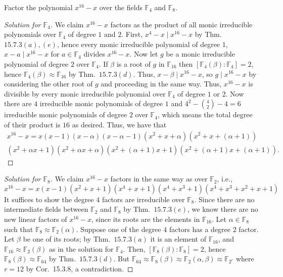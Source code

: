 \documentclass[12pt]{article}
\theoremstyle{remark}
\begin{document}
\setcounter{subsubsection}{5}
\begin{problem}
  Factor the polynomial $x^{16} - x$ over the fields $\mathbb{F}_4$ and $\mathbb{F}_8$.
\end{problem}
\begin{proof}[Solution for $\mathbb{F}_4$]
  We claim $x^{16}- x$ factors as the product of all monic irreducible polynomials over $\mathbb{F}_4$ of degree $1$ and $2$. First, $x^4-x \mid x^{16}-x$ by Thm.~$15.7.3(a),(e)$, hence every monic irreducible polynomial of degree $1$, $x-a \mid x^{16} - x$ for $a \in \mathbb{F}_4$ divides $x^{16} - x$. Now let $g$ be a monic irreducible polynomial of degree $2$ over $\mathbb{F}_4$. If $\beta$ is a root of $g$ in $\mathbb{F}_{16}$ then $[\mathbb{F}_4(\beta) : \mathbb{F}_4] = 2$, hence $\mathbb{F}_4(\beta) \approx \mathbb{F}_{16}$ by Thm.~$15.7.3(d)$. Thus, $x-\beta \mid x^{16} - x$, so $g \mid x^{16} - x$ by considering the other root of $g$ and proceeding in the same way. Thus, $x^{16} - x$ is divisible by every monic irreducible polynomial over $\mathbb{F}_4$ of degree $1$ or $2$. Now there are $4$ irreducible monic polynomials of degree $1$ and $4^2 - \binom{4}{2} - 4 = 6$ irreducible monic polynomials of degree $2$ over $\mathbb{F}_4$, which means the total degree of their product is $16$ as desired. Thus, we have that
  \begin{multline*}
    x^{16}-x = x(x-1)(x-\alpha)(x-\alpha-1)(x^2+x+\alpha)(x^2+x+(\alpha+1))\\
    (x^2 + \alpha x + 1)(x^2 + \alpha x + \alpha)(x^2 + (\alpha+1)x + 1)(x^2 + (\alpha+1)x + (\alpha+1)).\tag*{\qed}
  \end{multline*}
  \renewcommand{\qedsymbol}{}
\end{proof}
\vspace{-2\baselineskip}
\begin{proof}[Solution for $\mathbb{F}_8$]
  We claim $x^{16} - x$ factors in the same way as over $\mathbb{F}_2$, i.e.,
  \begin{equation*}
    x^{16}-x = x(x-1)(x^2 + x + 1)(x^4 + x + 1)(x^4 + x^3 + 1)(x^4 + x^3 + x^2 + x + 1)
  \end{equation*}
  It suffices to show the degree $4$ factors are irreducible over $\mathbb{F}_8$. Since there are no intermediate fields between $\mathbb{F}_2$ and $\mathbb{F}_8$ by Thm.~$15.7.3(e)$, we know there are no new linear factors of $x^{16}-x$, since its roots are the elements in $\mathbb{F}_{16}$. Let $\alpha \in \mathbb{F}_8$ such that $\mathbb{F}_8 \approx \mathbb{F}_2(\alpha)$. Suppose one of the degree $4$ factors has a degree $2$ factor. Let $\beta$ be one of its roots; by Thm.~$15.7.3(a)$ it is an element of $\mathbb{F}_{16}$, and $\mathbb{F}_{16} \approx \mathbb{F}_2(\beta)$ as in the solution for $\mathbb{F}_4$. Then, $[\mathbb{F}_8(\beta) : \mathbb{F}_8] = 2$, hence $\mathbb{F}_8(\beta) \approx \mathbb{F}_{64}$ by Thm.~$15.7.3(d)$. But $\mathbb{F}_{64} \approx \mathbb{F}_8(\beta) \approx \mathbb{F}_2(\alpha,\beta) \approx \mathbb{F}_{2^r}$ where $r = 12$ by Cor.~15.3.8, a contradiction.
\end{proof}
\end{document}
